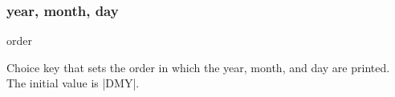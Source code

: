 \documentclass{beerydoc}
\begin{document}
\subsubsection{year, month, day}
\label{subsubsec:ymd}

\begin{codedoc}{order}
  \begin{syntax}
  \end{syntax}
  Choice key that sets the order in which the year, month, and day are printed.
  The initial value is |DMY|.
  \begin{codedemo}
    \\
    \\
    \\
    \\
    \\
    \\
    \\
    \\
  \end{codedemo}
\end{codedoc}
\end{document}

